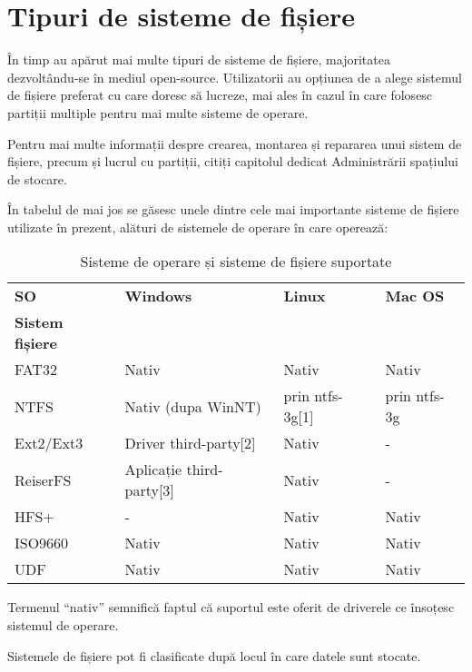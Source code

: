 \section{Tipuri de sisteme de fișiere}

În timp au apărut mai multe tipuri de sisteme de fișiere, majoritatea
dezvoltându-se în mediul open-source. Utilizatorii au opțiunea de a alege
sistemul de fișiere preferat cu care doresc să lucreze, mai ales în cazul în
care folosesc partiții multiple pentru mai multe sisteme de operare.

Pentru mai multe informații despre crearea, montarea și repararea unui sistem de
fișiere, precum și lucrul cu partiții, citiți capitolul dedicat Administrării
spațiului de stocare.

În tabelul de mai jos se găsesc unele dintre cele mai importante sisteme de
fișiere utilizate în prezent, alături de sistemele de operare în care operează:

\begin{table}[htb]
\caption{Sisteme de operare și sisteme de fișiere suportate}
\begin{center}
	\begin{tabular}{ | p{} | p{} | p{} | p{} | }
	\hline
		\textbf{SO} & \textbf{Windows} & \textbf{Linux} & \textbf{Mac OS} \\
		\textbf{Sistem fișiere} & & & \\
	\hline
		FAT32 & Nativ & Nativ & Nativ \\
	\hline
		NTFS & Nativ (dupa WinNT) & prin ntfs-3g[1] & prin ntfs-3g \\
	\hline
		Ext2/Ext3 & Driver third-party[2] & Nativ & - \\
	\hline
		ReiserFS & Aplicație third-party[3] & Nativ & - \\
	\hline
		HFS+ & - & Nativ & Nativ \\
	\hline
		ISO9660 & Nativ & Nativ & Nativ \\
	\hline
		UDF & Nativ & Nativ & Nativ \\
	\hline
	\end{tabular}
	\label{table:metode-backup}
\end{center}
\end{table}

Termenul “nativ” semnifică faptul că suportul este oferit de driverele ce
însoțesc sistemul de operare.

Sistemele de fișiere pot fi clasificate după locul în care datele sunt stocate.

